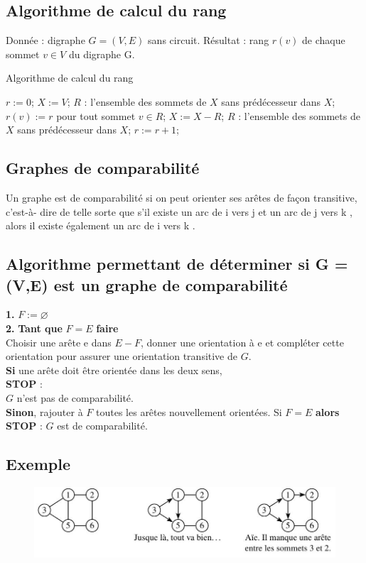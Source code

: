 \subsection*{Algorithme de calcul du rang}
Donnée : digraphe $ G = (V, E) $ sans circuit.
Résultat : rang $ r(v) $ de chaque sommet $ v \in V $ du digraphe G.

\begin{algorithm}
	\caption{Algorithme de calcul du rang}\label{euclid}
	\begin{algorithmic}[1]
		\Procedure{}{}
		\State $r := 0 $;
		\State $X := V $;
		\State $ R $ : l'ensemble des sommets de $ X $ sans prédécesseur dans $ X $;
		\State $ r(v) := r $ pour tout sommet $ v \in R $;
		\State $ X := X - R $;
		\State $ R $ : l'ensemble des sommets de $ X $ sans prédécesseur dans $ X$;
		\State $ r := r + 1$;
		\EndWhile
		\EndProcedure
	\end{algorithmic}
\end{algorithm}

\subsection{Graphes de comparabilité}
Un graphe est de comparabilité si on peut orienter ses arêtes de façon transitive, c'est-à-
dire de telle sorte que s'il existe un arc de i vers j et un arc de j vers k , alors il existe
également un arc de i vers k .

\subsection*{Algorithme permettant de déterminer si G = (V,E) est un graphe de comparabilité}
\noindent \textbf{1.} $ F := \varnothing $\\
\textbf{2.} \textbf{Tant que} $ F = E $ \textbf{faire}\\
Choisir une arête e dans $ E - F  $, donner une orientation à e et compléter cette
orientation pour assurer une orientation transitive de $ G $.\\
\textbf{Si} une arête doit être orientée dans les deux sens,\\ \textbf{STOP} :\\
$ G $ n'est pas de comparabilité.\\
\textbf{Sinon}, rajouter à $ F $ toutes les arêtes nouvellement orientées. Si $ F = E $ \textbf{alors}\\
\textbf{STOP} :
$ G $ est de comparabilité.
\subsection*{Exemple}
\begin{figure}[h]
\centering
\includegraphics[width=\linewidth]{images/graph25}
\end{figure}
